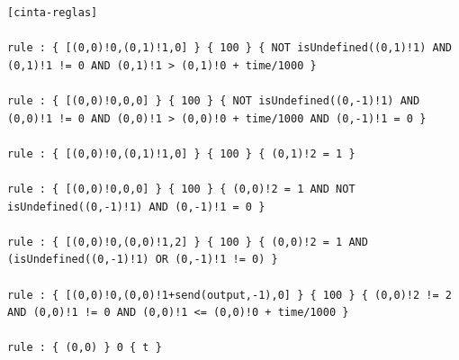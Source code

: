 \documentclass[10pt]{article}
\begin{document}
\begin{minipage}{1\textwidth}
	\centering
	\begin{lstlisting}
[cinta-reglas]

rule : { [(0,0)!0,(0,1)!1,0] } { 100 } { NOT isUndefined((0,1)!1) AND (0,1)!1 != 0 AND (0,1)!1 > (0,1)!0 + time/1000 }

rule : { [(0,0)!0,0,0] } { 100 } { NOT isUndefined((0,-1)!1) AND (0,0)!1 != 0 AND (0,0)!1 > (0,0)!0 + time/1000 AND (0,-1)!1 = 0 } 

rule : { [(0,0)!0,(0,1)!1,0] } { 100 } { (0,1)!2 = 1 }

rule : { [(0,0)!0,0,0] } { 100 } { (0,0)!2 = 1 AND NOT isUndefined((0,-1)!1) AND (0,-1)!1 = 0 }

rule : { [(0,0)!0,(0,0)!1,2] } { 100 } { (0,0)!2 = 1 AND (isUndefined((0,-1)!1) OR (0,-1)!1 != 0) }

rule : { [(0,0)!0,(0,0)!1+send(output,-1),0] } { 100 } { (0,0)!2 != 2 AND (0,0)!1 != 0 AND (0,0)!1 <= (0,0)!0 + time/1000 }

rule : { (0,0) } 0 { t }
	\end{lstlisting}
\end{minipage}
\end{document}
